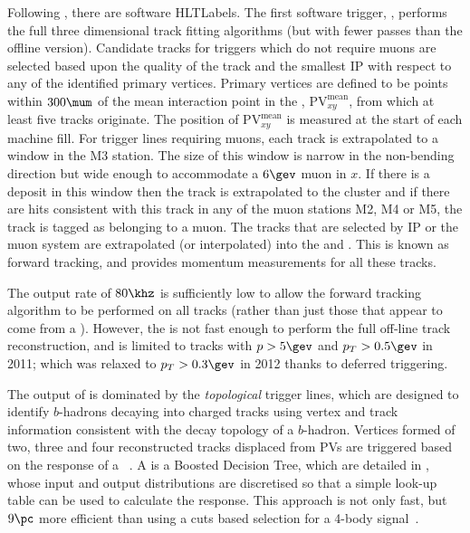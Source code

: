 Following \lone, there are software \glspl{HLTLabel}.
The first software trigger, \hltone, performs the full three dimensional \velo track fitting
algorithms (but with fewer passes than the offline version).
Candidate \velo tracks for triggers which do not require muons are selected based upon the quality of the
\velo track and the smallest IP with respect to any of the identified primary vertices.
Primary vertices are defined to be points within $300\mum$ of the mean
interaction point in the , $\mathrm{PV}^\mathrm{mean}_{xy}$, from which at least five
tracks originate.
The position of $\mathrm{PV}^\mathrm{mean}_{xy}$ is measured at the start of each \lhc machine
fill.
For trigger lines requiring muons, each \velo track is extrapolated to a window in the M3
station.
The size of this window is narrow in the non-bending direction but wide enough to accommodate a $6\gev$
muon in $x$.
If there is a deposit in this window then the \velo track is extrapolated to the cluster and if
there are hits consistent with this track in any of the muon stations M2, M4 or M5, the track is
tagged as belonging to a muon.
The \velo tracks that are selected by IP or the muon system are extrapolated (or interpolated) into
the \intr and \ot.
This is known as forward tracking, and provides momentum measurements for all these tracks.


The \hltone output rate of $80\khz$ is sufficiently low to allow the forward tracking algorithm to
be performed on all \velo tracks (rather than just those that appear to come from a \pv).
However, the \hlttwo is not fast enough to perform the full off-line track reconstruction, and
is limited to \velo tracks with
$p>5\gev$ and $p_T>0.5\gev$ in 2011; which was relaxed to $p_T>0.3\gev$ in 2012 thanks to deferred
triggering.

The output of \hlttwo is dominated by the \emph{topological} trigger lines, which are designed to
identify $b$-hadrons decaying into charged tracks using vertex and track information consistent
with the decay topology of a $b$-hadron.
Vertices formed of two, three and four reconstructed tracks displaced from \glspl{PV} are triggered
based on the response of a \BBDT~\cite{Gligorov:2012qt}.
A \BBDT is a Boosted Decision Tree, which are detailed in , whose input and output
distributions are discretised so that a simple look-up table can be used to calculate the response.
This approach is not only fast, but $9\pc$ more efficient than using a cuts based selection for a
4-body signal~\cite{Gligorov:2012qt}.


